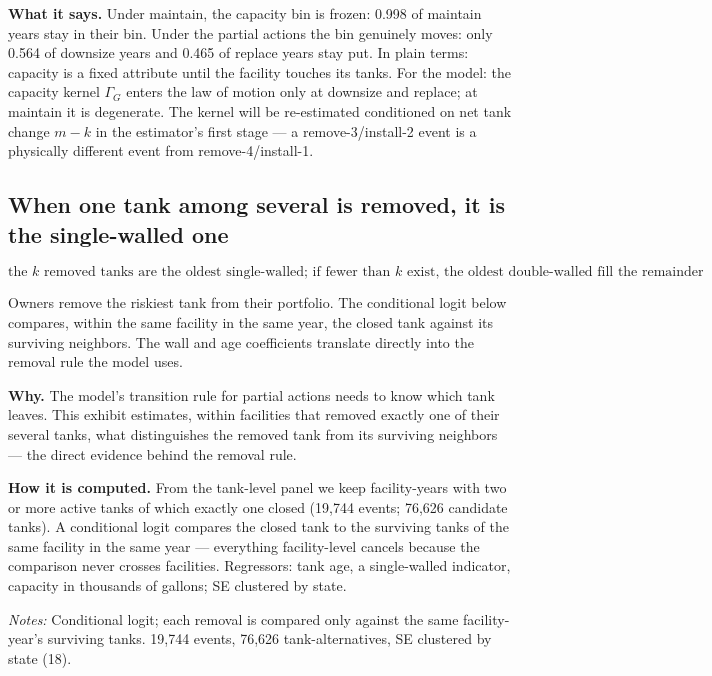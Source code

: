 \documentclass[
  letterpaper,
  DIV=11,
  numbers=noendperiod]{scrartcl}
\begin{document}
\textbf{What it says.} Under maintain, the capacity bin is frozen: 0.998
of maintain years stay in their bin. Under the partial actions the bin
genuinely moves: only 0.564 of downsize years and 0.465 of replace years
stay put. In plain terms: capacity is a fixed attribute until the
facility touches its tanks. For the model: the capacity kernel
\(\Gamma_G\) enters the law of motion only at downsize and replace; at
maintain it is degenerate. The kernel will be re-estimated conditioned
on net tank change \(m - k\) in the estimator's first stage --- a
remove-3/install-2 event is a physically different event from
remove-4/install-1.

\subsection{When one tank among several is removed, it is the
single-walled one}\label{sec-ae-x6}

\[
\text{the } k \text{ removed tanks are the oldest single-walled; if fewer than }
k \text{ exist, the oldest double-walled fill the remainder}
\]

Owners remove the riskiest tank from their portfolio. The conditional
logit below compares, within the same facility in the same year, the
closed tank against its surviving neighbors. The wall and age
coefficients translate directly into the removal rule the model uses.

\textbf{Why.} The model's transition rule for partial actions needs to
know which tank leaves. This exhibit estimates, within facilities that
removed exactly one of their several tanks, what distinguishes the
removed tank from its surviving neighbors --- the direct evidence behind
the removal rule.

\textbf{How it is computed.} From the tank-level panel we keep
facility-years with two or more active tanks of which exactly one closed
(19,744 events; 76,626 candidate tanks). A conditional logit compares
the closed tank to the surviving tanks of the same facility in the same
year --- everything facility-level cancels because the comparison never
crosses facilities. Regressors: tank age, a single-walled indicator,
capacity in thousands of gallons; SE clustered by state.

\begin{table}[H]
\centering
\caption{Which tank is removed: within-facility comparison}

\par\vspace{4pt}
{\footnotesize\textit{Notes:} Conditional logit; each removal is compared only
against the same facility-year's surviving tanks. 19,744 events, 76,626
tank-alternatives, SE clustered by state (18).\par}
\end{table}
\end{document}

